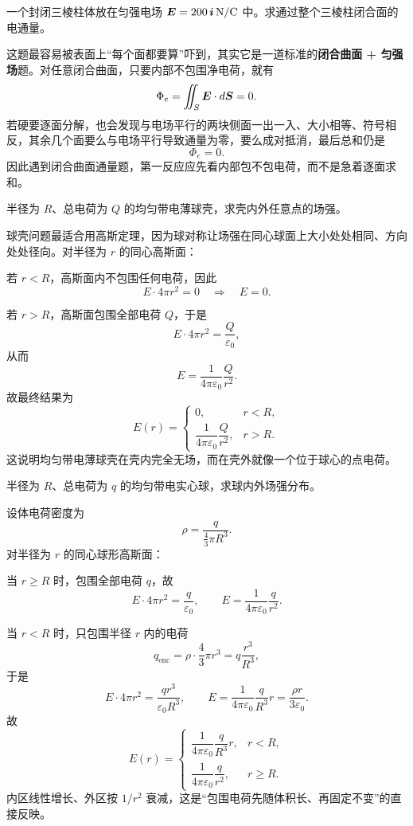 \documentclass[lang=cn,11pt]{elegantbook}
\begin{document}
\begin{example}[匀强电场中三棱柱的电通量]
一个封闭三棱柱体放在匀强电场 \(\vb*{E}=200\,\vb*{i}\,\mathrm{N/C}\) 中。求通过整个三棱柱闭合面的电通量。
\end{example}

\begin{solution}
这题最容易被表面上“每个面都要算”吓到，其实它是一道标准的\textbf{闭合曲面 + 匀强场}题。对任意闭合曲面，只要内部不包围净电荷，就有
\[
\Phi_e=\iint_S \vb*{E}\cdot d\vb*{S}=0.
\]
若硬要逐面分解，也会发现与电场平行的两块侧面一出一入、大小相等、符号相反，其余几个面要么与电场平行导致通量为零，要么成对抵消，最后总和仍是
\[
\boxed{\Phi_e=0}.
\]
因此遇到闭合曲面通量题，第一反应应先看内部包不包电荷，而不是急着逐面求和。
\end{solution}

\begin{example}[均匀带电球壳的场强分布]
半径为 \(R\)、总电荷为 \(Q\) 的均匀带电薄球壳，求壳内外任意点的场强。
\end{example}

\begin{solution}
球壳问题最适合用高斯定理，因为球对称让场强在同心球面上大小处处相同、方向处处径向。对半径为 \(r\) 的同心高斯面：

若 \(r<R\)，高斯面内不包围任何电荷，因此
\[
E\cdot 4\pi r^2=0
\quad\Longrightarrow\quad
E=0.
\]

若 \(r>R\)，高斯面包围全部电荷 \(Q\)，于是
\[
E\cdot 4\pi r^2=\frac{Q}{\varepsilon_0},
\]
从而
\[
E=\frac{1}{4\pi\varepsilon_0}\frac{Q}{r^2}.
\]
故最终结果为
\[
\boxed{
E(r)=
\begin{cases}
0, & r<R,\\[4pt]
\dfrac{1}{4\pi\varepsilon_0}\dfrac{Q}{r^2}, & r>R.
\end{cases}}
\]
这说明均匀带电薄球壳在壳内完全无场，而在壳外就像一个位于球心的点电荷。
\end{solution}

\begin{example}[均匀带电实心球的场强分布]
半径为 \(R\)、总电荷为 \(q\) 的均匀带电实心球，求球内外场强分布。
\end{example}

\begin{solution}
设体电荷密度为
\[
\rho=\frac{q}{\frac43\pi R^3}.
\]
对半径为 \(r\) 的同心球形高斯面：

当 \(r\ge R\) 时，包围全部电荷 \(q\)，故
\[
E\cdot 4\pi r^2=\frac{q}{\varepsilon_0},
\qquad
E=\frac{1}{4\pi\varepsilon_0}\frac{q}{r^2}.
\]

当 \(r<R\) 时，只包围半径 \(r\) 内的电荷
\[
q_{\mathrm{enc}}=\rho\cdot \frac43\pi r^3=q\frac{r^3}{R^3},
\]
于是
\[
E\cdot 4\pi r^2=\frac{q r^3}{\varepsilon_0 R^3},
\qquad
E=\frac{1}{4\pi\varepsilon_0}\frac{q}{R^3}r
=\frac{\rho r}{3\varepsilon_0}.
\]
故
\[
\boxed{
E(r)=
\begin{cases}
\dfrac{1}{4\pi\varepsilon_0}\dfrac{q}{R^3}r, & r<R,\\[6pt]
\dfrac{1}{4\pi\varepsilon_0}\dfrac{q}{r^2}, & r\ge R.
\end{cases}}
\]
内区线性增长、外区按 \(1/r^2\) 衰减，这是“包围电荷先随体积长、再固定不变”的直接反映。
\end{solution}
\end{document}
